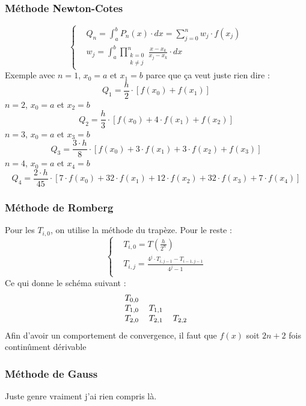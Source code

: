 \subsubsection*{Méthode Newton-Cotes}
\noindent
\begin{equation}
    \left\{
    \begin{aligned}
         & Q_n=\int_a^b P_n(x)\cdot dx = \sum_{j=0}^n w_j\cdot f(x_j) \\
         & w_j = \int_a^b \prod_{\substack{k=0                        \\ k\neq j}}^n \frac{x-x_k}{x_j-x_k}\cdot dx
    \end{aligned}
    \right.
    \nonumber
\end{equation}
Exemple avec $n=1$, $x_0=a$ et $x_1=b$ parce que ça veut juste rien dire :
\begin{equation}
    Q_1 = \frac{h}{2}\cdot[f(x_0)+f(x_1)]
    \nonumber
\end{equation}
$n=2$, $x_0=a$ et $x_2=b$
\begin{equation}
    Q_2 = \frac{h}{3}\cdot[f(x_0)+4\cdot f(x_1)+f(x_2)]
    \nonumber
\end{equation}
$n=3$, $x_0=a$ et $x_3=b$
\begin{equation}
    Q_3 = \frac{3\cdot h}{8}\cdot[f(x_0)+3\cdot f(x_1)+3\cdot f(x_2)+f(x_3)]
    \nonumber
\end{equation}
$n=4$, $x_0=a$ et $x_4=b$
\begin{equation}
    Q_4 = \frac{2\cdot h}{45}\cdot[7\cdot f(x_0)+32\cdot f(x_1)+12\cdot f(x_2)+32\cdot f(x_3)+7\cdot f(x_4)]
    \nonumber
\end{equation}
\subsubsection*{Méthode de Romberg}
\noindent
Pour les $T_{i,0}$, on utilise la méthode du trapèze. Pour le reste :
\begin{equation}
    \left\{
    \begin{aligned}
         & T_{i,0} = T\left(\frac{h}{2^n}\right)                  \\
         & T_{i,j} = \frac{4^j\cdot T_{i,j-1}-T_{i-1,j-1}}{4^j-1} \\
    \end{aligned}
    \right.
    \nonumber
\end{equation}
Ce qui donne le schéma suivant :
\begin{equation}
    \begin{tabular}{ccc}
        $T_{0,0}$ &           &           \\
        $T_{1,0}$ & $T_{1,1}$ &           \\
        $T_{2,0}$ & $T_{2,1}$ & $T_{2,2}$ \\
    \end{tabular}
    \nonumber
\end{equation}
Afin d'avoir un comportement de convergence, il faut que $f(x)$ soit
$2n + 2$ fois continûment dérivable
\subsubsection*{Méthode de Gauss}
\noindent
Juste genre vraiment j'ai rien compris là.

